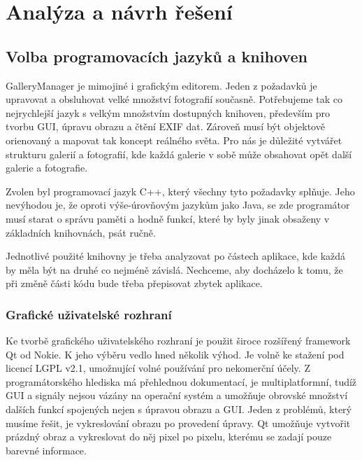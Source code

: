 \documentclass[11pt,twoside,a4paper]{book}
\begin{document}

%

\chapter{Analýza a návrh řešení}
\section{Volba programovacích jazyků a knihoven}
\noindent
GalleryManager je mimojiné i grafickým editorem. Jeden z požadavků je upravovat a obsluhovat velké množství fotografií současně. Potřebujeme tak co nejrychlejší jazyk s velkým množstvím dostupných knihoven, především pro tvorbu GUI, úpravu obrazu a čtění EXIF dat. Zároveň musí být objektově orienovaný a mapovat tak koncept reálného světa. Pro nás je důležité vytvářet strukturu galerií a fotografií, kde každá galerie v sobě může obsahovat opět další galerie a fotografie. 

\indent 
Zvolen byl programovací jazyk C++, který všechny tyto požadavky splňuje. Jeho nevýhodou je, že oproti výše-úrovňovým jazykům jako Java, se zde programátor musí starat o správu paměti a hodně funkcí, které by byly jinak obsaženy v základních knihovnách, psát ručně.

\indent
Jednotlivé použité knihovny je třeba analyzovat po částech aplikace, kde každá by měla být na druhé co nejméně závislá. Nechceme, aby docházelo k tomu, že při změně části kódu bude třeba přepisovat zbytek aplikace.

\subsection{Grafické uživatelské rozhraní}
\indent
Ke tvorbě grafického uživatelského rozhraní je použit široce rozšířený framework Qt od Nokie. K jeho výběru vedlo hned několik výhod. Je volně ke stažení pod licencí LGPL v2.1, umožnující volné používání pro nekomerční účely. Z programátorského hlediska má přehlednou dokumentací, je multiplatformní, tudíž GUI a signály nejsou vázány na operační systém a umožňuje obrovské množství dalších funkcí spojených nejen s úpravou obrazu a GUI. Jeden z problémů, který musíme řešit, je vykreslování obrazu po provedení úpravy. Qt umožňuje vytvořit prázdný obraz a vykreslovat do něj pixel po pixelu, kterému se zadají pouze barevné informace.
\end{document}
